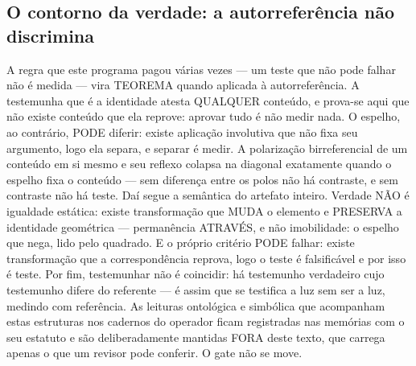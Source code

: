 \documentclass[11pt]{article}
\theoremstyle{definition}\newtheorem{deriv}{Derivação}
\begin{document}
\subsection*{O contorno da verdade: a autorrefer\^encia n\~ao discrimina}A regra que este programa pagou v\'arias vezes --- um teste que n\~ao pode falhar n\~ao \'e medida --- vira TEOREMA quando aplicada \`a autorrefer\^encia. A testemunha que \'e a identidade atesta QUALQUER conte\'udo, e prova-se aqui que n\~ao existe conte\'udo que ela reprove: aprovar tudo \'e n\~ao medir nada. O espelho, ao contr\'ario, PODE diferir: existe aplica\c{c}\~ao involutiva que n\~ao fixa seu argumento, logo ela separa, e separar \'e medir. A polariza\c{c}\~ao birreferencial de um conte\'udo em si mesmo e seu reflexo colapsa na diagonal exatamente quando o espelho fixa o conte\'udo --- sem diferen\c{c}a entre os polos n\~ao h\'a contraste, e sem contraste n\~ao h\'a teste. Da\'i segue a sem\^antica do artefato inteiro. Verdade N\~AO \'e igualdade est\'atica: existe transforma\c{c}\~ao que MUDA o elemento e PRESERVA a identidade geom\'etrica --- perman\^encia ATRAV\'ES, e n\~ao imobilidade: o espelho que nega, lido pelo quadrado. E o pr\'oprio crit\'erio PODE falhar: existe transforma\c{c}\~ao que a correspond\^encia reprova, logo o teste \'e falsific\'avel e por isso \'e teste. Por fim, testemunhar n\~ao \'e coincidir: h\'a testemunho verdadeiro cujo testemunho difere do referente --- \'e assim que se testifica a luz sem ser a luz, medindo com refer\^encia. As leituras ontol\'ogica e simb\'olica que acompanham estas estruturas nos cadernos do operador ficam registradas nas mem\'orias com o seu estatuto e s\~ao deliberadamente mantidas FORA deste texto, que carrega apenas o que um revisor pode conferir. O gate n\~ao se move.
\end{document}
